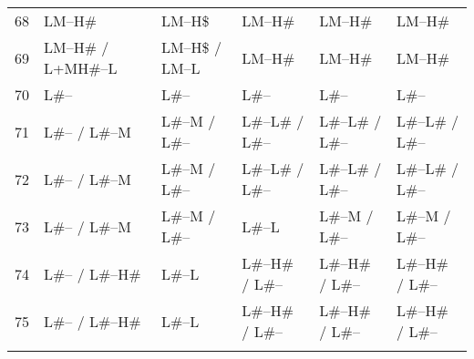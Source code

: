 {\begin{subtables}
\begin{table}[h!!]
{\begin{tabularx}{\textwidth}{ P{5mm} Q Q Q Q Q }
					68 & LM--H\# & LM--H\$ & LM--H\# & LM--H\# & LM--H\#\\
					69 & LM--H\# / L+MH\#--L & LM--H\$ / LM--L & LM--H\# & LM--H\# & LM--H\#\\
					70 & L\#-- & L\#-- & L\#-- & L\#-- & L\#--\\
					71 & L\#-- / L\#--M & L\#--M / L\#-- & L\#--L\# / L\#-- & L\#--L\# / L\#-- & L\#--L\# / L\#--\\
					72 & L\#-- / L\#--M & L\#--M / L\#-- & L\#--L\# / L\#-- & L\#--L\# / L\#-- & L\#--L\# / L\#--\\
					73 & L\#-- / L\#--M & L\#--M / L\#-- & L\#--L & L\#--M / L\#-- & L\#--M / L\#--\\
					74 & L\#-- / L\#--H\# & L\#--L & L\#--H\# / L\#-- & L\#--H\# / L\#-- & L\#--H\# / L\#--\\
					75 & L\#-- / L\#--H\# & L\#--L & L\#--H\# / L\#-- & L\#--H\# / L\#-- & L\#--H\# / L\#--\\
				\lspbottomrule
				\end{tabularx}
			}
		\end{table}
		

\end{subtables}}
